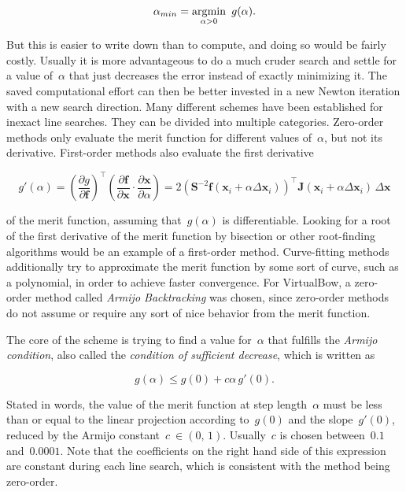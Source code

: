 \begin{equation}
\alpha_{min} = \argmin_{\alpha > 0}\ g(\alpha).
\end{equation}

But this is easier to write down than to compute, and doing so would be fairly costly.
Usually it is more advantageous to do a much cruder search and settle for a value of~$\alpha$ that just decreases the error instead of exactly minimizing it.
The saved computational effort can then be better invested in a new Newton iteration with a new search direction.
Many different schemes have been established for inexact line searches.
They can be divided into multiple categories.
Zero-order methods only evaluate the merit function for different values of~$\alpha$, but not its derivative.
First-order methods also evaluate the first derivative

\begin{equation}
g'(\alpha) = \left(\frac{\partial g}{\partial \boldsymbol{f}}\right)^\intercal\left(\frac{\partial \boldsymbol{f}}{\partial \boldsymbol{x}} \cdot \frac{\partial \boldsymbol{x}}{\partial \alpha}\right) = 2\left(\boldsymbol{S}^{-2}\boldsymbol{f}(\boldsymbol{x}_{i} + \alpha\Delta\boldsymbol{x}_{i})\right)^\intercal\boldsymbol{J}(\boldsymbol{x}_{i} + \alpha\Delta\boldsymbol{x}_{i})\,\Delta\boldsymbol{x}
\end{equation}

of the merit function, assuming that~$g(\alpha)$ is differentiable.
Looking for a root of the first derivative of the merit function by bisection or other root-finding algorithms would be an example of a first-order method.
Curve-fitting methods additionally try to approximate the merit function by some sort of curve, such as a polynomial, in order to achieve faster convergence.
For VirtualBow, a zero-order method called \textit{Armijo Backtracking} was chosen, since zero-order methods do not assume or require any sort of nice behavior from the merit function.

The core of the scheme is trying to find a value for~$\alpha$ that fulfills the \textit{Armijo condition}, also called the \textit{condition of sufficient decrease}, which is written as

\begin{equation}
g(\alpha) \le g(0) + c\alpha\,g'(0).
\end{equation}

Stated in words, the value of the merit function at step length~$\alpha$ must be less than or equal to the linear projection according to~$g(0)$ and the slope~$g'(0)$, reduced by the Armijo constant~$c\ \in (0,\,1)$.
Usually~$c$ is chosen between~$0.1$ and~$0.0001$.
Note that the coefficients on the right hand side of this expression are constant during each line search, which is consistent with the method being zero-order.

